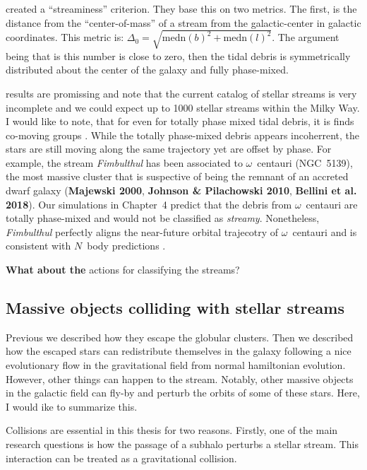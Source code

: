             \citet{2024ApJ...976...54P} created a ``streaminess'' criterion. They base this on two metrics. The first, is the distance from the ``center-of-mass'' of a stream from the galactic-center in galactic coordinates. This metric is:
            $\Delta_0 = \sqrt{\mathrm{medn}(b)^2+\mathrm{medn}(l)^2}$. The argument being that is this number is close to zero, then the tidal debris is symmetrically distributed about the center of the galaxy and fully phase-mixed. 

            \citet{2024ApJ...976...54P} results are promissing and note that the current catalog of stellar streams is very incomplete and we could expect up to 1000 stellar streams within the Milky Way. I would like to note, that for even for totally phase mixed tidal debris, it is finds co-moving groups \citep{2018MNRAS.477.4063M,2018MNRAS.478.3862M}. While the totally phase-mixed debris appears incoherrent, the stars are still moving along the same trajectory yet are offset by phase. For example, the stream \textit{Fimbulthul} has been associated to $\omega$~centauri (NGC~5139), the most massive cluster that is suspective of being the remnant of an accreted dwarf galaxy (\textbf{Majewski 2000}, \textbf{Johnson \& Pilachowski 2010}, \textbf{Bellini et al. 2018}). Our simulations in Chapter~4 predict that the debris from $\omega$~centauri are totally phase-mixed and would not be classified as \textit{streamy}. Nonetheless, \textit{Fimbulthul} perfectly aligns the near-future orbital trajecotry of $\omega$~centauri and is consistent with $N$~body predictions \citep{2021ApJ...914..123I}.

            \textbf{What about the } actions for classifying the streams? 

            
    \subsection{Massive objects colliding with stellar streams}
        
        Previous we described how they escape the globular clusters. Then we described how the escaped stars can redistribute themselves in the galaxy following a nice evolutionary flow in the gravitational field from normal hamiltonian evolution. However, other things can happen to the stream. Notably, other massive objects in the galactic field can fly-by and perturb the orbits of some of these stars. Here, I would ike to summarize this. 

        Collisions are essential in this thesis for two reasons. Firstly, one of the main research questions is how the passage of a subhalo perturbs a stellar stream. This interaction can be treated as a gravitational collision.

